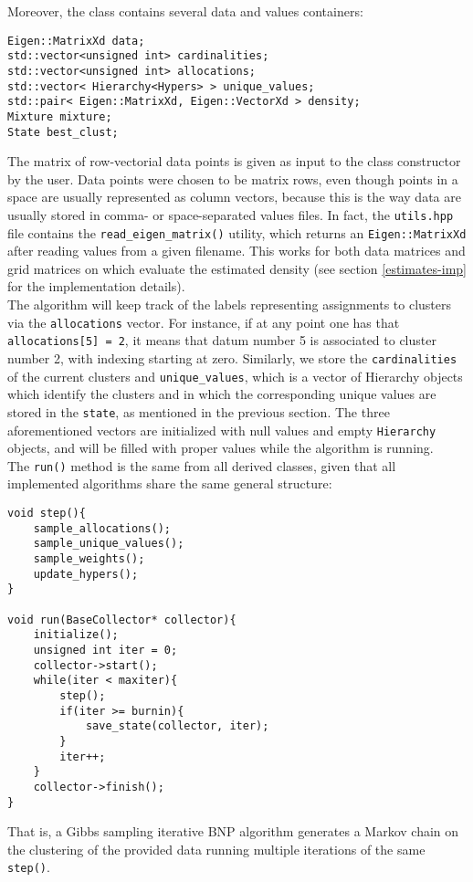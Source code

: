 Moreover, the class contains several data and values containers:
\begin{verbatim}
Eigen::MatrixXd data;
std::vector<unsigned int> cardinalities;
std::vector<unsigned int> allocations;
std::vector< Hierarchy<Hypers> > unique_values;
std::pair< Eigen::MatrixXd, Eigen::VectorXd > density;
Mixture mixture;
State best_clust;
\end{verbatim}
The matrix of row-vectorial data points is given as input to the class constructor by the user.
Data points were chosen to be matrix rows, even though points in a space are usually represented as column vectors, because this is the way data are usually stored in comma- or space-separated values files.
In fact, the \verb|utils.hpp| file contains the \verb|read_eigen_matrix()| utility, which returns an \verb|Eigen::MatrixXd| after reading values from a given filename.
This works for both data matrices and grid matrices on which evaluate the estimated density (see section \ref{estimates-imp} for the implementation details). \\
The algorithm will keep track of the labels representing assignments to clusters via the \verb|allocations| vector.
For instance, if at any point one has that \verb|allocations[5] = 2|, it means that datum number 5 is associated to cluster number 2, with indexing starting at zero.
Similarly, we store the \verb|cardinalities| of the current clusters and \verb|unique_values|, which is a vector of Hierarchy objects which identify the clusters and in which the corresponding unique values are stored in the \verb|state|, as mentioned in the previous section.
The three aforementioned vectors are initialized with null values and empty \verb|Hierarchy| objects, and will be filled with proper values while the algorithm is running. \\
The \verb|run()| method is the same from all derived classes, given that all implemented algorithms share the same general structure:
\begin{verbatim}
void step(){
    sample_allocations();
    sample_unique_values();
    sample_weights();
    update_hypers();
}

void run(BaseCollector* collector){
    initialize();
    unsigned int iter = 0;
    collector->start();
    while(iter < maxiter){
        step();
        if(iter >= burnin){
            save_state(collector, iter);
        }
        iter++;
    }
    collector->finish();
}    
\end{verbatim}
That is, a Gibbs sampling iterative BNP algorithm generates a Markov chain on the clustering of the provided data running multiple iterations of the same \verb|step()|.
